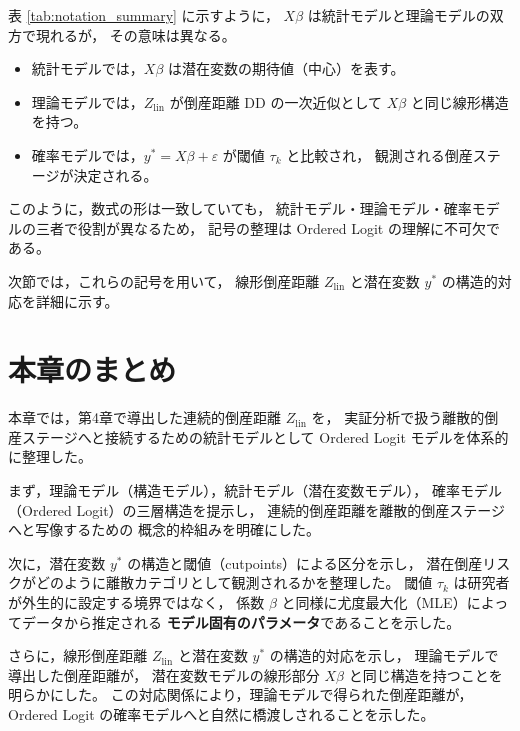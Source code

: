 表 \ref{tab:notation_summary} に示すように，
$X\beta$ は統計モデルと理論モデルの双方で現れるが，
その意味は異なる。

\begin{itemize}
    \item 統計モデルでは，$X\beta$ は潜在変数の期待値（中心）を表す。
    \item 理論モデルでは，$Z_{\text{lin}}$ が倒産距離 DD の一次近似として
          $X\beta$ と同じ線形構造を持つ。
    \item 確率モデルでは，$y^* = X\beta + \varepsilon$ が閾値 $\tau_k$ と比較され，
          観測される倒産ステージが決定される。
\end{itemize}

このように，数式の形は一致していても，
統計モデル・理論モデル・確率モデルの三者で役割が異なるため，
記号の整理は Ordered Logit の理解に不可欠である。

次節では，これらの記号を用いて，
線形倒産距離 $Z_{\text{lin}}$ と潜在変数 $y^*$ の構造的対応を詳細に示す。


\section{本章のまとめ}
\label{sec:ordered_logit_summary}

本章では，第4章で導出した連続的倒産距離 $Z_{\text{lin}}$ を，
実証分析で扱う離散的倒産ステージへと接続するための統計モデルとして
Ordered Logit モデルを体系的に整理した。

まず，理論モデル（構造モデル），統計モデル（潜在変数モデル），
確率モデル（Ordered Logit）の三層構造を提示し，
連続的倒産距離を離散的倒産ステージへと写像するための
概念的枠組みを明確にした。

次に，潜在変数 $y^*$ の構造と閾値（cutpoints）による区分を示し，
潜在倒産リスクがどのように離散カテゴリとして観測されるかを整理した。
閾値 $\tau_k$ は研究者が外生的に設定する境界ではなく，
係数 $\beta$ と同様に尤度最大化（MLE）によってデータから推定される
\textbf{モデル固有のパラメータ}であることを示した。

さらに，線形倒産距離 $Z_{\text{lin}}$ と潜在変数 $y^*$ の構造的対応を示し，
理論モデルで導出した倒産距離が，
潜在変数モデルの線形部分 $X\beta$ と同じ構造を持つことを明らかにした。
この対応関係により，理論モデルで得られた倒産距離が，
Ordered Logit の確率モデルへと自然に橋渡しされることを示した。

